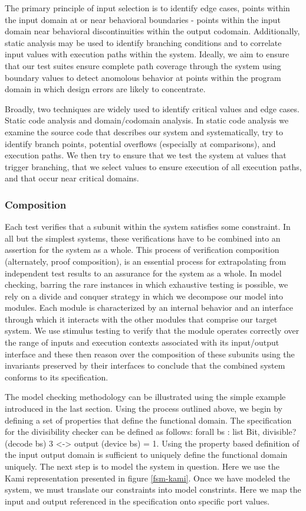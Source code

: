 \documentclass[10pt,a4paper]{article}
\begin{document}
The primary principle of input selection is to identify edge cases, points within the input domain at or near behavioral boundaries - points within the input domain near behavioral discontinuities within the output codomain. Additionally, static analysis may be used to identify branching conditions and to correlate input values with execution paths within the system. Ideally, we aim to ensure that our test suites ensure complete path coverage through the system using boundary values to detect anomolous behavior at points within the program domain in which design errors are likely to concentrate.

Broadly, two techniques are widely used to identify critical values and edge cases. Static code analysis and domain/codomain analysis. In static code analysis we examine the source code that describes our system and systematically, try to identify branch points, potential overflows (especially at comparisons), and execution paths. We then try to ensure that we test the system at values that trigger branching, that we select values to ensure execution of all execution paths, and that occur near critical domains.

\subsubsection{Composition}
Each test verifies that a subunit within the system satisfies some constraint. In all but the simplest systems, these verifications have to be combined into an assertion for the system as a whole. This process of verification composition (alternately, proof composition), is an essential process for extrapolating from independent test results to an assurance for the system as a whole. In model checking, barring the rare instances in which exhaustive testing is possible, we rely on a divide and conquer strategy in which we decompose our model into modules. Each module is characterized by an internal behavior and an interface through which it interacts with the other modules that comprise our target system. We use stimulus testing to verify that the module operates correctly over the range of inputs and execution contexts associated with its input/output interface and these then reason over the composition of these subunits using the invariants preserved by their interfaces to conclude that the combined system conforms to its specification.

The model checking methodology can be illustrated using the simple example introduced in the last section. Using the process outlined above, we begin by defining a set of properties that define the functional domain. The specification for the divisibility checker can be defined as follows: forall bs : list Bit, divisible? (decode bs) 3 <-> output (device bs) = 1. Using the property based definition of the input output domain is sufficient to uniquely define the functional domain uniquely. The next step is to model the system in question. Here we use the Kami representation presented in figure \ref{fsm-kami}. Once we have modeled the system, we must translate our constraints into model constrints. Here we map the input and output referenced in the specification onto specific port values.
\end{document}
